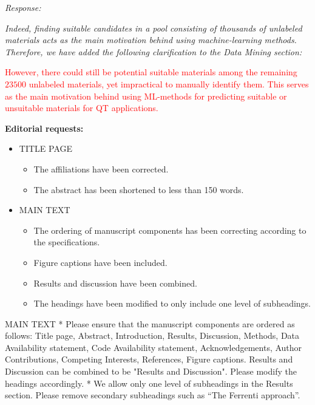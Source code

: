 \documentclass[11pt, a4paper]{letter} %
\begin{document}
\textit{Response:} 

\textit{Indeed, finding suitable candidates in a pool consisting of thousands of unlabeled materials acts as the main motivation behind using machine-learning methods. Therefore, we have added the following clarification to the Data Mining section:}

\textcolor{red}{However, there could still be potential suitable materials among the remaining $23500$ unlabeled materials, yet impractical to manually identify them. This serves as the main motivation behind using ML-methods for predicting suitable or unsuitable materials for QT applications.}

\newpage

\noindent 
\textbf{Editorial requests:} 

\begin{itemize}
    \item TITLE PAGE 
    \begin{itemize}
        \item The affiliations have been corrected.  
        \item The abstract has been shortened to less than 150 words. 
    \end{itemize}
    \item MAIN TEXT 
    \begin{itemize}
        \item The ordering of manuscript components has been correcting according to the specifications. 
        \item Figure captions have been included. 
        \item Results and discussion have been combined. 
        \item The headings have been modified to only include one level of subheadings. 
    \end{itemize}
\end{itemize}

MAIN TEXT
* Please ensure that the manuscript components are ordered as follows: Title page, Abstract, Introduction, Results, Discussion, Methods, Data Availability statement, Code Availability statement, Acknowledgements, Author Contributions, Competing Interests, References, Figure captions. 
Results and Discussion can be combined to be "Results and Discussion". Please modify the headings accordingly.
* We allow only one level of subheadings in the Results section. Please remove secondary subheadings such as “The Ferrenti approach”.
\end{document}
